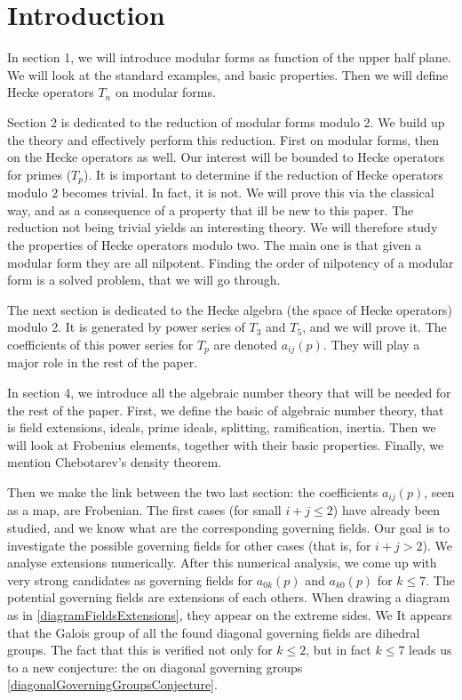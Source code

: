\setcounter{section}{-1}
\section{Introduction}


In section 1, we will introduce modular forms as function of the upper half plane.
We will look at the standard examples, and basic properties.
Then we will define Hecke operators $T_n$ on modular forms.

Section 2 is dedicated to the reduction of modular forms modulo 2.
We build up the theory and effectively perform this reduction.
First on modular forms, then on the Hecke operators as well.
Our interest will be bounded to Hecke operators for primes ($T_p$).
It is important to determine if the reduction of Hecke operators modulo 2 becomes trivial.
In fact, it is not.
We will prove this via the classical way, and as a consequence of a property that ill be new to this paper.
The reduction not being trivial yields an interesting theory.
We will therefore study the properties of Hecke operators modulo two.
The main one is that given a modular form they are all nilpotent.
Finding the order of nilpotency of a modular form is a solved problem, that we will go through.

The next section is dedicated to the Hecke algebra (the space of Hecke operators) modulo 2.
It is generated by power series of $T_3$ and $T_5$, and we will prove it.
The coefficients of this power series for $T_p$ are denoted $a_{ij}(p)$.
They will play a major role in the rest of the paper.

In section 4, we introduce all the algebraic number theory that will be needed for the rest of the paper.
First, we define the basic of algebraic number theory, that is field extensions, ideals, prime ideals, splitting, ramification, inertia.
Then we will look at Frobenius elements, together with their basic properties.
Finally, we mention Chebotarev's density theorem.

Then we make the link between the two last section: the coefficients $a_{ij}(p)$, seen as a map, are Frobenian.
The first cases (for small $i+j \leq 2$) have already been studied, and we know what are the corresponding governing fields.
Our goal is to investigate the possible governing fields for other cases (that is, for $i+j>2$).
We analyse extensions numerically.
After this numerical analysis, we come up with very strong candidates as governing fields for $a_{0k}(p)$ and $a_{k0}(p)$ for $k \leq 7$.
The potential governing fields are extensions of each others.
When drawing a diagram as in \ref{diagramFieldsExtensions}, they appear on the extreme sides.
We 
It appears that the Galois group of all the found diagonal governing fields are dihedral groups.
The fact that this is verified not only for $k \leq 2$, but in fact $k \leq 7$ leads us to a new conjecture: the on diagonal governing groups \ref{diagonalGoverningGroupsConjecture}.

